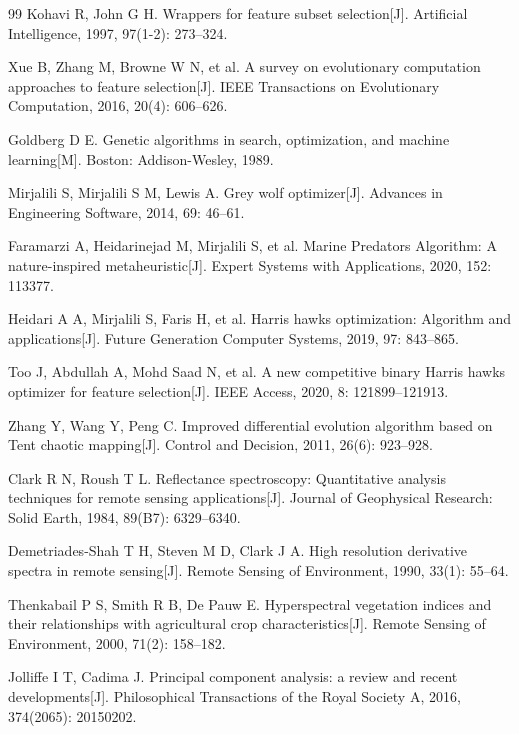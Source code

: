 \documentclass[12pt,a4paper]{article}
\begin{document}
\begin{thebibliography}{99}
Kohavi R, John G H.
Wrappers for feature subset selection[J].
Artificial Intelligence, 1997, 97(1-2): 273--324.

Xue B, Zhang M, Browne W N, et al.
A survey on evolutionary computation approaches to feature selection[J].
IEEE Transactions on Evolutionary Computation, 2016, 20(4): 606--626.

Goldberg D E.
Genetic algorithms in search, optimization, and machine learning[M].
Boston: Addison-Wesley, 1989.

Mirjalili S, Mirjalili S M, Lewis A.
Grey wolf optimizer[J].
Advances in Engineering Software, 2014, 69: 46--61.

Faramarzi A, Heidarinejad M, Mirjalili S, et al.
Marine Predators Algorithm: A nature-inspired metaheuristic[J].
Expert Systems with Applications, 2020, 152: 113377.

Heidari A A, Mirjalili S, Faris H, et al.
Harris hawks optimization: Algorithm and applications[J].
Future Generation Computer Systems, 2019, 97: 843--865.

Too J, Abdullah A, Mohd Saad N, et al.
A new competitive binary Harris hawks optimizer for feature selection[J].
IEEE Access, 2020, 8: 121899--121913.

Zhang Y, Wang Y, Peng C.
Improved differential evolution algorithm based on Tent chaotic mapping[J].
Control and Decision, 2011, 26(6): 923--928.

Clark R N, Roush T L.
Reflectance spectroscopy: Quantitative analysis techniques for remote sensing applications[J].
Journal of Geophysical Research: Solid Earth, 1984, 89(B7): 6329--6340.

Demetriades-Shah T H, Steven M D, Clark J A.
High resolution derivative spectra in remote sensing[J].
Remote Sensing of Environment, 1990, 33(1): 55--64.

Thenkabail P S, Smith R B, De Pauw E.
Hyperspectral vegetation indices and their relationships with agricultural crop characteristics[J].
Remote Sensing of Environment, 2000, 71(2): 158--182.

Jolliffe I T, Cadima J.
Principal component analysis: a review and recent developments[J].
Philosophical Transactions of the Royal Society A, 2016, 374(2065): 20150202.


\end{thebibliography}
\end{document}
